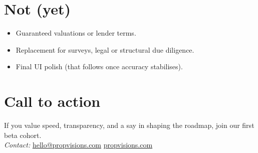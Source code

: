 \documentclass[11pt,a4paper]{article}
\begin{document}
\section*{Not (yet)}
\begin{itemize}
  \item Guaranteed valuations or lender terms.
  \item Replacement for surveys, legal or structural due diligence.
  \item Final UI polish (that follows once accuracy stabilises).
\end{itemize}

\section*{Call to action}
If you value speed, transparency, and a say in shaping the roadmap, join our first beta cohort.\\[0.25em]
\textit{Contact:} \href{mailto:hello@propvisions.com}{hello@propvisions.com} \quad\textbar\quad \href{https://www.propvisions.com}{propvisions.com}
\end{document}

